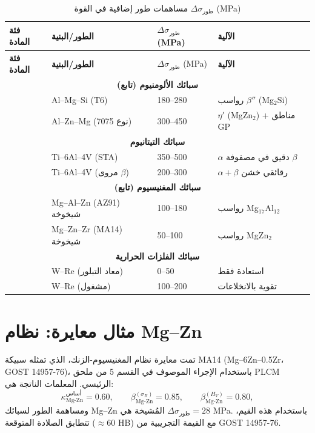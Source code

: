 \documentclass[12pt,a4paper]{article}
\begin{document}
	\begin{longtable}{p{3.5cm} p{3.0cm} p{3.0cm} p{4cm}}
		\caption{مساهمات طور إضافية في القوة \(\Delta\sigma_{\text{طور}}\) (MPa)}\label{tab:phase_contrib_extended}\\
		\toprule
		\textbf{فئة المادة} & \textbf{الطور/البنية} & \(\Delta\sigma_{\text{طور}}\) (MPa) & \textbf{الآلية} \\
		\midrule
		\endfirsthead
		\toprule
		\textbf{فئة المادة} & \textbf{الطور/البنية} & \(\Delta\sigma_{\text{طور}}\) (MPa) & \textbf{الآلية} \\
		\midrule
		\endhead
		\multicolumn{4}{c}{\textbf{سبائك الألومنيوم (تابع)}} \\
		& Al–Mg–Si (T6) & 180–280 & رواسب \(\beta''\) (Mg\(_2\)Si) \\
		& Al–Zn–Mg (نوع 7075) & 300–450 & \(\eta'\) (MgZn\(_2\)) + مناطق GP \\
		\hline
		\multicolumn{4}{c}{\textbf{سبائك التيتانيوم}} \\
		& Ti–6Al–4V (STA) & 350–500 & \(\alpha\) دقيق في مصفوفة \(\beta\) \\
		& Ti–6Al–4V (مروى \(\beta\)) & 200–300 & \(\alpha+\beta\) رقائقي خشن \\
		\hline
		\multicolumn{4}{c}{\textbf{سبائك المغنيسيوم (تابع)}} \\
		& Mg–Al–Zn (AZ91) شيخوخة & 100–180 & رواسب Mg\(_{17}\)Al\(_{12}\) \\
		& Mg–Zn–Zr (MA14) شيخوخة & 50–100 & رواسب MgZn\(_2\) \\
		\hline
		\multicolumn{4}{c}{\textbf{سبائك الفلزات الحرارية}} \\
		& W–Re (معاد التبلور) & 0–50 & استعادة فقط \\
		& W–Re (مشغول) & 100–200 & تقوية بالانخلاعات \\
		\bottomrule
	\end{longtable}
	
	\section{مثال معايرة: نظام Mg–Zn}
	تمت معايرة نظام المغنيسيوم-الزنك، الذي تمثله سبيكة MA14 (Mg–6Zn–0.5Zr، GOST 14957-76)، باستخدام الإجراء الموصوف في القسم 5 من ملحق PLCM الرئيسي. المعلمات الناتجة هي:
	\[
	\kappa_{\text{Mg-Zn}}^{\text{أساس}} = 0.60,\qquad
	\beta_{\text{Mg-Zn}}^{(\sigma_B)} = 0.85,\qquad
	\beta_{\text{Mg-Zn}}^{(H_V)} = 0.80,
	\]
	ومساهمة الطور لسبائك Mg–Zn المُشيخة هي \(\Delta\sigma_{\text{طور}} = 28\) MPa. باستخدام هذه القيم، تتطابق الصلادة المتوقعة (\(\approx 60\) HB) مع القيمة التجريبية من GOST 14957-76.
	
\end{document}
